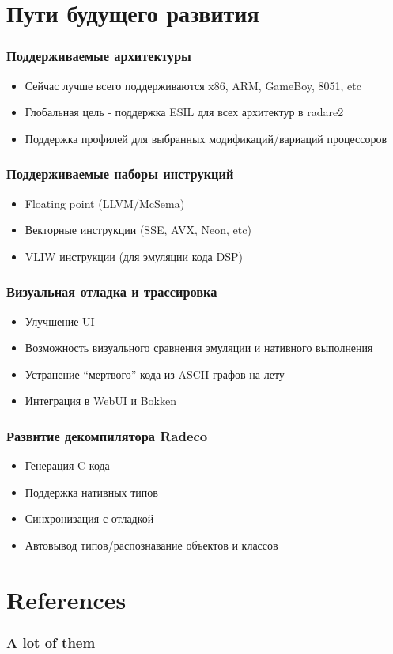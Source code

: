 \documentclass[10pt,pdf,utf8,english,compress,hyperref={unicode}]{beamer}
\begin{document}
\section{Пути будущего развития}

\begin{frame}[fragile]
  \frametitle{Поддерживаемые архитектуры}
     \begin{itemize}
        \item Сейчас лучше всего поддерживаются x86, ARM, GameBoy, 8051, etc
		\item Глобальная цель - поддержка ESIL для всех архитектур в radare2
		\item Поддержка профилей для выбранных модификаций/вариаций процессоров
      \end{itemize}
\end{frame}

\begin{frame}[fragile]
  \frametitle{Поддерживаемые наборы инструкций}
     \begin{itemize}
        \item Floating point (LLVM/McSema) 
		\item Векторные инструкции (SSE, AVX, Neon, etc)
		\item VLIW инструкции (для эмуляции кода DSP)
      \end{itemize}
\end{frame}

\begin{frame}[fragile]
  \frametitle{Визуальная отладка и трассировка}
     \begin{itemize}
        \item Улучшение UI
		\item Возможность визуального сравнения эмуляции и нативного выполнения
		\item Устранение ``мертвого'' кода из ASCII графов на лету
		\item Интеграция в WebUI и Bokken 
      \end{itemize}
\end{frame}

\begin{frame}[fragile]
  \frametitle{Развитие декомпилятора Radeco}
     \begin{itemize}
        \item Генерация C кода
		\item Поддержка нативных типов
		\item Синхронизация с отладкой
		\item Автовывод типов/распознавание объектов и классов 
      \end{itemize}
\end{frame}

\ifxetex
\else
\section{References}
\begin{frame}[allowframebreaks]
	\frametitle{A lot of them}
	\printbibliography
\end{frame}
\fi
\end{document}
